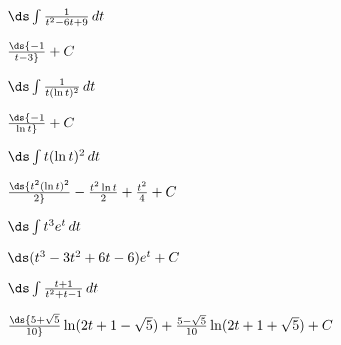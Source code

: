 \begin{exercises}
\begin{exercise} $\ds\int {1\over t^2-6t+9}\,dt$
\begin{answer} $\ds{-1\over t-3}+C$
\end{answer}\end{exercise}

\begin{exercise} $\ds\int {1\over t(\ln t)^2}\,dt$
\begin{answer} $\ds{-1\over \ln t}+C$
\end{answer}\end{exercise}

\begin{exercise} $\ds\int t(\ln t)^2\,dt$
\begin{answer} $\ds{t^2(\ln t)^2\over 2}-{t^2\ln t\over 2}+{t^2\over4}+C$
\end{answer}\end{exercise}

\begin{exercise} $\ds\int t^3e^{t}\,dt$
\begin{answer} $\ds(t^3-3t^2+6t-6)e^t+C$
\end{answer}\end{exercise}

\begin{exercise} $\ds\int {t+1\over t^2+t-1}\,dt$
\begin{answer} $\ds{5+\sqrt5\over10}
\ln(2t+1-\sqrt5)+{5-\sqrt5\over10}\ln(2t+1+\sqrt5)+C$
\end{answer}\end{exercise}

\endtwocol
\end{exercises}
